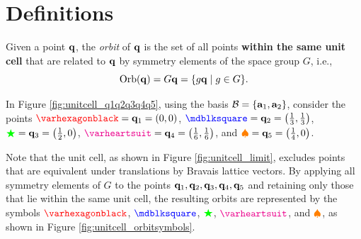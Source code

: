 \section{Definitions}


\begin{definition} \label{def:orbit_q}
Given a point \({\vb{q}}\), the \textit{orbit} of \({\vb{q}}\) is the set of all points \textbf{within the same unit cell} that are related to \({\vb{q}}\) by symmetry elements of the space group \(G\), i.e.,
\begin{equation} \label{eq:orbit_of_q}
\text{Orb}({\vb{q}}) = G {\vb{q}} = \{g {\vb{q}} \mid g \in G\}.
\end{equation}
\end{definition}

\begin{example} \label{ex:orbit_1a2b3c}
In Figure \ref{fig:unitcell_q1q2q3q4q5}, using the basis $\mathcal{B} = \{{\vb{a}}_1, {\vb{a}}_2\}$, consider the points \(\textcolor{red}{\varhexagonblack} = \q_1 = (0,0)\), \(\textcolor{blue}{\mdblksquare} = \q_2 = \qty(\frac{1}{3}, \frac{1}{3})\), \(\textcolor{green}{\bigstar} = {\vb{q}}_3 = \qty(\frac{1}{2}, 0)\), \(\textcolor{magenta}{\varheartsuit} = \q_4 = \qty(\frac{1}{6}, \frac{1}{6})\), and \(\textcolor{orange}{\spadesuit} = {\vb{q}}_5 = \qty(\frac{1}{4}, 0)\).

Note that the unit cell, as shown in Figure \ref{fig:unitcell_limit}, excludes points that are equivalent under translations by Bravais lattice vectors. By applying all symmetry elements of \(G\) to the points \({\vb{q}}_1, {\vb{q}}_2, {\vb{q}}_3, {\vb{q}}_4, {\vb{q}}_5\) and retaining only those that lie within the same unit cell, the resulting orbits are represented by the symbols \(\textcolor{red}{\varhexagonblack}\), \(\textcolor{blue}{\mdblksquare}\), \(\textcolor{green}{\bigstar}\), \(\textcolor{magenta}{\varheartsuit}\), and \(\textcolor{orange}{\spadesuit}\), as shown in Figure \ref{fig:unitcell_orbitsymbols}.
\end{example}


